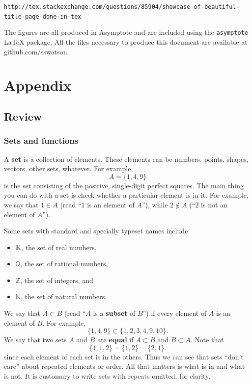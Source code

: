 \documentclass{watsonbook}
\begin{document}
\texttt{http://tex.stackexchange.com/questions/85904/showcase-of-beautiful-title-page-done-in-tex}

The figures are all produced in Asymptote and are included using the
\texttt{asymptote} LaTeX package. All the files necessary to produce
this document are available at github.com/sswatson.

\appendix

\chapter{Appendix}

\section{Review} 

\subsection{Sets and functions}  \label{a:setsandfunctions}

A \textbf{set} is a collection of elements. These elements can be numbers, points, shapes, vectors, other sets, whatever. For example, 
\[
  A = \{1,4,9\} 
\]
is the set consisting of the positive, single-digit perfect squares. The main thing you can do with a set is check whether a particular element is in it. For example, we say that $1 \in A$ (read ``1 is an element of $A$''), while $2 \notin A$ (``2 is not an element of $A$''). 

Some sets with standard and specially typeset names include 
\begin{itemize} 
\item $\mathbb{R}$, the set of real numbers, 
\item $\mathbb{Q}$, the set of rational numbers, 
\item $\mathbb{Z}$, the set of integers, and 
\item $\mathbb{N}$, the set of natural numbers. 
\end{itemize}
  
\begin{tcolorbox}[title = Subsets and set equality, parbox = false, colframe = MidnightBlue, colback=softblue] 
We say that $A \subset B$ (read ``$A$ is a \textbf{subset} of $B$'') if every element of $A$ is an element of $B$. For example, 
\[
\{1,4,9\} \subset \{1,2,3,4,9,10\}. 
\]
We say that two sets $A$ and $B$ are \textbf{equal} if $A\subset B$ and $B\subset A$. Note that 
\[
\{1,1,2\} = \{1,2\} = \{2,1\} . 
\]
since each element of each set is in the others. Thus we can see that
sets ``don't care'' about repeated elements or order. All that matters
is what is in and what is not. It is customary to write sets with
repeats omitted, for clarity.
\end{tcolorbox} \enlargethispage{1cm} 
\end{document}
